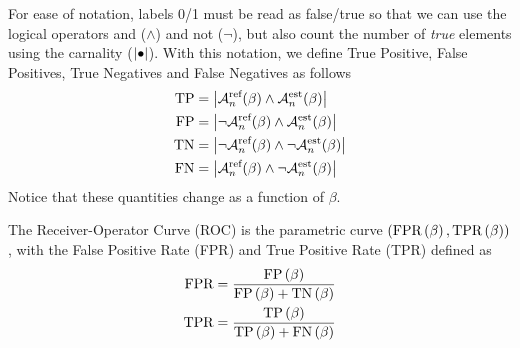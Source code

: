 For ease of notation, labels 0/1 must be read as false/true so that we can use the logical operators and ($\wedge$) and not ($\neg$), but also count the number of \textit{true} elements using the carnality ($\left| {\bullet} \right|$).
%
With this notation, we define True Positive, False Positives, True Negatives and False Negatives as follows
\begin{align}
\text{TP}
&=
\left| { 
\mathcal{A}_n^{\text{ref}}(\beta) \wedge 
\mathcal{A}_n^{\text{est}}(\beta) } \right|
\\
\text{FP}
&=
\left| { 
\neg \mathcal{A}_n^{\text{ref}}(\beta) \wedge 
\mathcal{A}_n^{\text{est}}(\beta) } \right|
\\
\text{TN}
&=
\left| { 
\neg \mathcal{A}_n^{\text{ref}}(\beta) \wedge 
\neg \mathcal{A}_n^{\text{est}}(\beta) } \right|
\\
\text{FN}
&=
\left| { 
\mathcal{A}_n^{\text{ref}}(\beta) \wedge 
\neg \mathcal{A}_n^{\text{est}}(\beta) } \right|
\end{align}
Notice that these quantities change as a function of $\beta$.

The Receiver-Operator Curve (ROC) is the parametric curve 
$\left( \text{FPR}\left( \beta \right), \text{TPR}\left( \beta \right) \right)$, with the False Positive Rate (FPR) and True Positive Rate (TPR) defined as
\begin{align}
\text{FPR}
&=
\frac{ \text{FP}\left( \beta \right) }{\text{FP}\left( \beta \right) + \text{TN}\left( \beta \right)}
\\
\text{TPR}
&=
\frac{ \text{TP}\left( \beta \right) }{\text{TP}\left( \beta \right) + \text{FN}\left( \beta \right)}
\end{align}

